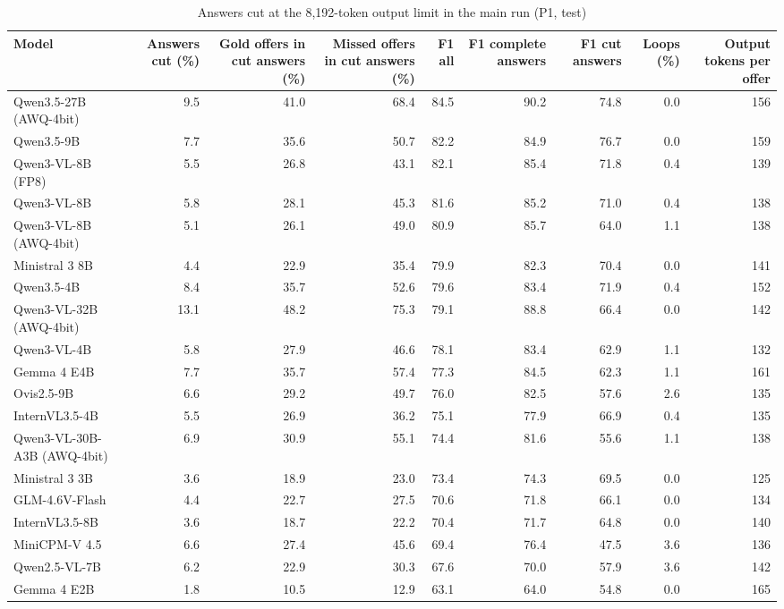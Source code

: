 \begin{table}[t]
\centering
\caption{Answers cut at the 8,192-token output limit in the main run (P1, test)}
\label{tab:truncation}
\small
\begin{tabular}{lrrrrrrrr}
\toprule
Model & Answers cut (\%) & Gold offers in cut answers (\%) & Missed offers in cut answers (\%) & F1 all & F1 complete answers & F1 cut answers & Loops (\%) & Output tokens per offer \\
\midrule
Qwen3.5-27B (AWQ-4bit) & 9.5 & 41.0 & 68.4 & 84.5 & 90.2 & 74.8 & 0.0 & 156 \\
Qwen3.5-9B & 7.7 & 35.6 & 50.7 & 82.2 & 84.9 & 76.7 & 0.0 & 159 \\
Qwen3-VL-8B (FP8) & 5.5 & 26.8 & 43.1 & 82.1 & 85.4 & 71.8 & 0.4 & 139 \\
Qwen3-VL-8B & 5.8 & 28.1 & 45.3 & 81.6 & 85.2 & 71.0 & 0.4 & 138 \\
Qwen3-VL-8B (AWQ-4bit) & 5.1 & 26.1 & 49.0 & 80.9 & 85.7 & 64.0 & 1.1 & 138 \\
Ministral 3 8B & 4.4 & 22.9 & 35.4 & 79.9 & 82.3 & 70.4 & 0.0 & 141 \\
Qwen3.5-4B & 8.4 & 35.7 & 52.6 & 79.6 & 83.4 & 71.9 & 0.4 & 152 \\
Qwen3-VL-32B (AWQ-4bit) & 13.1 & 48.2 & 75.3 & 79.1 & 88.8 & 66.4 & 0.0 & 142 \\
Qwen3-VL-4B & 5.8 & 27.9 & 46.6 & 78.1 & 83.4 & 62.9 & 1.1 & 132 \\
Gemma 4 E4B & 7.7 & 35.7 & 57.4 & 77.3 & 84.5 & 62.3 & 1.1 & 161 \\
Ovis2.5-9B & 6.6 & 29.2 & 49.7 & 76.0 & 82.5 & 57.6 & 2.6 & 135 \\
InternVL3.5-4B & 5.5 & 26.9 & 36.2 & 75.1 & 77.9 & 66.9 & 0.4 & 135 \\
Qwen3-VL-30B-A3B (AWQ-4bit) & 6.9 & 30.9 & 55.1 & 74.4 & 81.6 & 55.6 & 1.1 & 138 \\
Ministral 3 3B & 3.6 & 18.9 & 23.0 & 73.4 & 74.3 & 69.5 & 0.0 & 125 \\
GLM-4.6V-Flash & 4.4 & 22.7 & 27.5 & 70.6 & 71.8 & 66.1 & 0.0 & 134 \\
InternVL3.5-8B & 3.6 & 18.7 & 22.2 & 70.4 & 71.7 & 64.8 & 0.0 & 140 \\
MiniCPM-V 4.5 & 6.6 & 27.4 & 45.6 & 69.4 & 76.4 & 47.5 & 3.6 & 136 \\
Qwen2.5-VL-7B & 6.2 & 22.9 & 30.3 & 67.6 & 70.0 & 57.9 & 3.6 & 142 \\
Gemma 4 E2B & 1.8 & 10.5 & 12.9 & 63.1 & 64.0 & 54.8 & 0.0 & 165 \\

\end{tabular}
\end{table}
